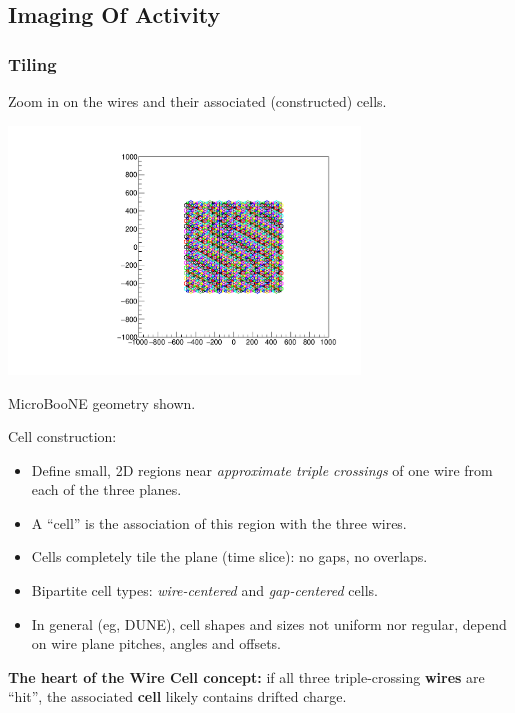 \documentclass[xcolor=dvipsnames]{beamer}
\begin{document}
\subsection{Imaging Of Activity}

\begin{frame}[fragile]
  \frametitle{Tiling}

  \vspace{-5mm}

  \begin{center}
    \scriptsize Zoom in on the wires and their associated (constructed) cells.

    \includegraphics[width=0.7\textwidth,trim=8.6cm 9cm 8.6cm 9cm,clip]{test_boundcells.pdf}

    MicroBooNE geometry shown.
  \end{center}

  \vspace{-5mm}

  \footnotesize
  Cell construction:
  \begin{itemize}
  \item Define small, 2D regions near \textit{approximate triple crossings} of one wire from each of the three planes.
  \item A ``cell'' is the association of this region with the three wires. 
  \item Cells completely tile the plane (time slice): no gaps, no overlaps.
  \item Bipartite cell types: \textit{wire-centered} and \textit{gap-centered} cells.
  \item In general (eg, DUNE), cell shapes and sizes not uniform nor regular,
    depend on wire plane pitches, angles and offsets.
  \end{itemize}

  \textbf{The heart of the Wire Cell concept:} if all three
  triple-crossing \textbf{wires} are ``hit'', the associated \textbf{cell} likely
  contains drifted charge.

\end{frame}
\end{document}
